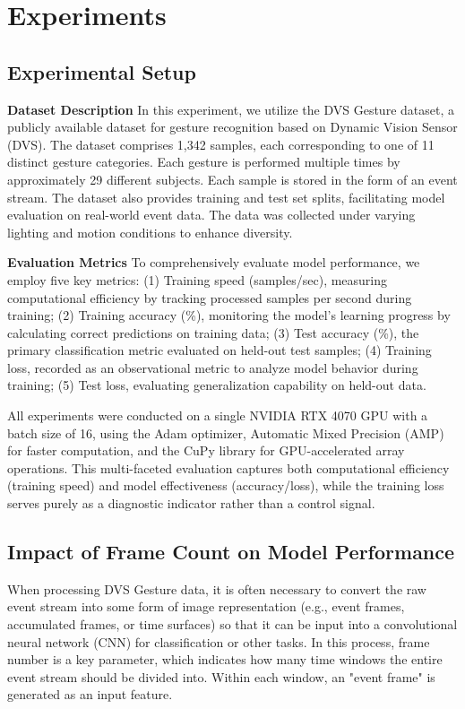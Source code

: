 \documentclass[conference]{IEEEtran}
\begin{document}
\section{Experiments}
\subsection{Experimental Setup}
\textbf{Dataset Description} In this experiment, we utilize the DVS Gesture dataset, a publicly available dataset for gesture recognition based on Dynamic Vision Sensor (DVS). 
The dataset comprises 1,342 samples, each corresponding to one of 11 distinct gesture categories.
Each gesture is performed multiple times by approximately 29 different subjects. 
Each sample is stored in the form of an event stream. 
The dataset also provides training and test set splits, facilitating model evaluation on real-world event data.
The data was collected under varying lighting and motion conditions to enhance diversity.

\textbf{Evaluation Metrics} To comprehensively evaluate model performance, we employ five key metrics: 
(1) Training speed (samples/sec), measuring computational efficiency by tracking processed samples per second during training; 
(2) Training accuracy (\%), monitoring the model's learning progress by calculating correct predictions on training data; 
(3) Test accuracy (\%), the primary classification metric evaluated on held-out test samples;
(4) Training loss, recorded as an observational metric to analyze model behavior during training; 
(5) Test loss, evaluating generalization capability on held-out data. 

All experiments were conducted on a single NVIDIA RTX 4070 GPU with a batch size of 16, using the Adam optimizer, 
Automatic Mixed Precision (AMP) for faster computation, and the CuPy library for GPU-accelerated array operations. 
This multi-faceted evaluation captures both computational efficiency (training speed) and model effectiveness (accuracy/loss), 
while the training loss serves purely as a diagnostic indicator rather than a control signal.

\subsection{Impact of Frame Count on Model Performance}
When processing DVS Gesture data, it is often necessary to convert the raw event stream into some form of image representation (e.g., event frames, accumulated frames, or time surfaces) so that it can be input into a convolutional neural network (CNN) for classification or other tasks. In this process, frame number is a key parameter, which indicates how many time windows the entire event stream should be divided into. Within each window, an "event frame" is generated as an input feature.
\end{document}
